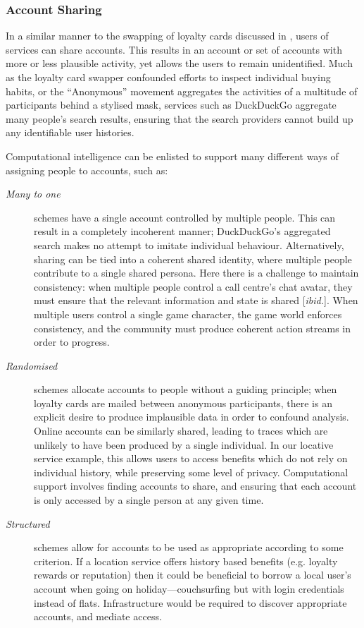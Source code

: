 \documentclass{IOS-Book-Article}     %
\newcommand{\tbox}[3][red]{{
\color{#1}\noindent{
   \fbox{\scriptsize{ {\bf #2} \textsl{#3}}}
   \vspace{2pt}
}
}}
\newcommand{\todo}[1]{\tbox{TODO:}{#1}}
\begin{document}
\subsubsection{Account Sharing}

In a similar manner to the swapping of loyalty cards discussed in
\cite{brunton2011vernacular}, users of services can share accounts. This
results in an account or set of accounts with more or less plausible activity,
yet allows the users to remain unidentified. 
Much as the loyalty card swapper confounded efforts to inspect individual
buying habits, or the ``Anonymous'' movement aggregates the activities of a
multitude of participants behind a stylised mask, services such as DuckDuckGo
aggregate many people's search results, ensuring that the search providers
cannot build up any identifiable user histories. 

Computational intelligence can be enlisted to support many different ways of assigning people to accounts,
 such as:
\begin{description}
  \item[\emph{Many to one}] schemes have a single account controlled by
  multiple people. This can result in a completely incoherent manner;
  DuckDuckGo's aggregated search makes no attempt to imitate
  individual behaviour. 
  Alternatively, sharing can be tied into a coherent shared identity,
   where multiple people contribute to a single shared persona\cite{dalton2013Pseudonymity}. 
   Here there is a challenge to maintain consistency: when multiple people
   control a call centre's chat avatar, they must ensure that the relevant
   information and state is shared [\emph{ibid.}]. When multiple users control a
   single game character, the game world enforces consistency, and the community
   must produce coherent action streams in order to progress.
   \item[\emph{Randomised}] schemes allocate accounts to people without a
   guiding principle; when loyalty cards are mailed between anonymous
   participants, there is an explicit desire to produce implausible data in
   order to confound analysis. Online accounts can be similarly shared, leading
   to traces which are unlikely to have been produced by a single individual.
   In our locative service example, this allows users to access benefits which
   do not rely on individual history, while preserving some level of privacy.
   Computational support involves finding accounts to share, and ensuring that
   each account is only accessed by a single person at any given time.
   \item[\emph{Structured}] schemes allow for accounts to be used as appropriate
   according to some criterion. If a location service offers history based
   benefits (e.g. loyalty rewards or reputation) then it could be beneficial to
   borrow a local user's account when going on holiday---couchsurfing but with
   login credentials instead of flats. Infrastructure would be required to
   discover appropriate accounts, and mediate access. 
\end{description}
\end{document}
